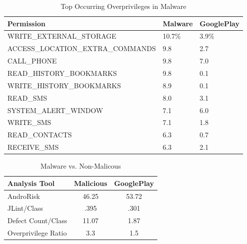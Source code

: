 \documentclass[conference]{IEEEtran}
\begin{document}




\begin{table}[t]

\caption{Top Occurring Overprivileges in Malware}
\label{Table:mal_permissions}
  \begin{tabular}{ | p{5.3cm} | p{1.0cm} | p{1.2cm} | } \hline

  \bfseries Permission&\bfseries Malware&\bfseries GooglePlay\\ \hline
  WRITE\_EXTERNAL\_STORAGE & 10.7\% & 3.9\% \\ \hline
  ACCESS\_LOCATION\_EXTRA\_COMMANDS & 9.8 & 2.7 \\ \hline
  CALL\_PHONE& 9.8 & 7.0 \\ \hline
  READ\_HISTORY\_BOOKMARKS & 9.8 & 0.1\ \\ \hline
  WRITE\_HISTORY\_BOOKMARKS & 8.9 & 0.1 \\ \hline
  READ\_SMS & 8.0 & 3.1 \\ \hline
  SYSTEM\_ALERT\_WINDOW & 7.1 & 6.0 \\ \hline
  WRITE\_SMS & 7.1 & 1.8 \\ \hline
  READ\_CONTACTS & 6.3 & 0.7 \\ \hline
  RECEIVE\_SMS & 6.3 & 2.1 \\ \hline
  \end{tabular}

\end{table}






\begin{table}[t]
\begin{center}
\caption{Malware vs. Non-Malicous}
\label{Table:maliciousvsnonmalicious}
  \begin{tabular}{ | l | c | c | } \hline

     \bfseries Analysis Tool  & \bfseries Malicious & \bfseries GooglePlay \\ \hline
    AndroRisk & 46.25 & 53.72 \\ \hline
    JLint/Class & .395 & .301 \\ \hline
    Defect Count/Class & 11.07 & 1.87 \\ \hline
    Overprivilege Ratio & 3.3 & 1.5 \\ \hline
  \end{tabular}
  \end{center}
\end{table}
\end{document}
